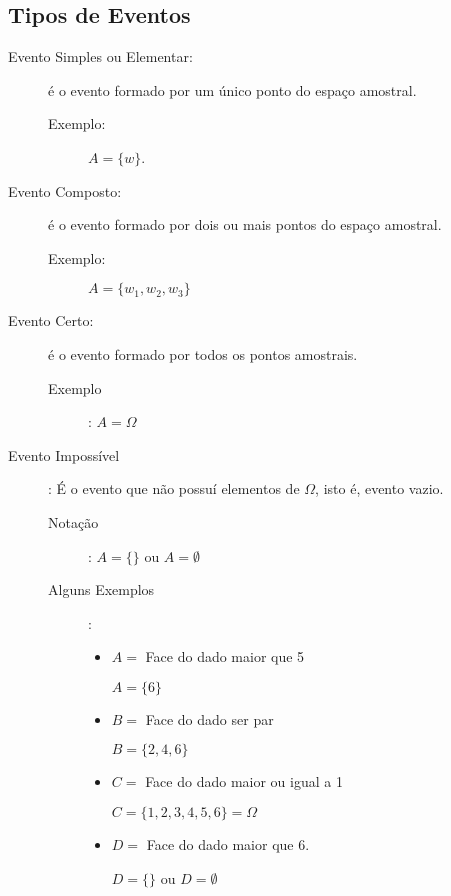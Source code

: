 \subsection{Tipos de Eventos}

\begin{description}
  \item [Evento Simples ou Elementar:] é o evento formado por um único ponto do espaço amostral. 
    \begin{description}
      \item [Exemplo:]
        $A=\{w \}$.
    \end{description}

  \item [Evento Composto:]  é o evento formado por dois ou mais pontos do espaço amostral.

    \begin{description}
      \item[Exemplo:]
        $ A= \{w_1,w_2,w_3 \}$
    \end{description}

  \item [Evento Certo:] é o evento formado por todos os pontos amostrais.
    \begin{description}
      \item    [Exemplo]: $A= \Omega$ 
    \end{description}
  \item [Evento Impossível]: É o evento que não possuí elementos de $\Omega$, isto é, evento vazio.
    \begin{description}
      \item [Notação]: $A=\{\}$ ou $A= \emptyset$

      \item    [Alguns Exemplos]:
        \begin{itemize}[label=]
          \item  $A=$ Face do dado maior que 5

            $A=\{6\}$

          \item    $B=$ Face do dado ser par 

            $B= \{2,4,6\}$

          \item    $C=$ Face do dado maior ou igual a 1

            $C= \{1,2,3,4,5,6\}=\Omega$

          \item        $D=$ Face do dado maior que 6.


            $D=\{ \}$ ou $D=\emptyset$
        \end{itemize}


    \end{description}
\end{description}
